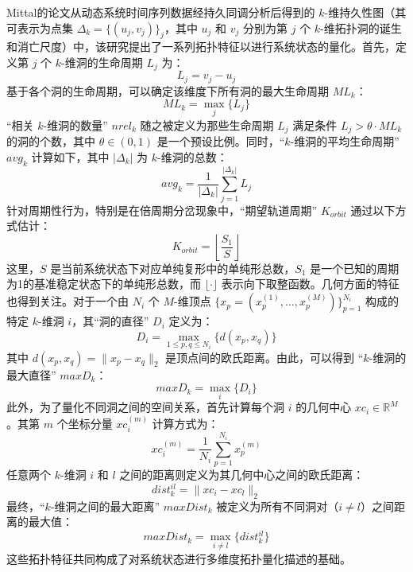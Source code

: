             Mittal的论文\cite{mittal2017topological}从动态系统时间序列数据经持久同调分析后得到的 $k$-维持久性图（其可表示为点集 $\Delta_k = \{(u_j, v_j)\}_j$，其中 $u_j$ 和 $v_j$ 分别为第 $j$ 个 $k$-维拓扑洞的诞生和消亡尺度）中，该研究提出了一系列拓扑特征以进行系统状态的量化。首先，定义第 $j$ 个 $k$-维洞的生命周期 $L_j$ 为：
            \begin{equation}
            L_j = v_j - u_j
            \end{equation}
            基于各个洞的生命周期，可以确定该维度下所有洞的最大生命周期 $ML_k$：
            \begin{equation}
            ML_k = \max_{j} \{L_j\}
            \end{equation}
            “相关 $k$-维洞的数量” $nrel_k$ 随之被定义为那些生命周期 $L_j$ 满足条件 $L_j > \theta \cdot ML_k$ 的洞的个数，其中 $\theta \in (0,1)$ 是一个预设比例。同时，“$k$-维洞的平均生命周期” $avg_k$ 计算如下，其中 $|\Delta_k|$ 为 $k$-维洞的总数：
            \begin{equation}
            avg_k = \frac{1}{|\Delta_k|} \sum_{j=1}^{|\Delta_k|} L_j
            \end{equation}
            针对周期性行为，特别是在倍周期分岔现象中，“期望轨道周期” $K_{orbit}$ 通过以下方式估计：
            \begin{equation}
            K_{orbit} = \left\lfloor \frac{S_1}{S} \right\rfloor
            \end{equation}
            这里，$S$ 是当前系统状态下对应单纯复形中的单纯形总数，$S_1$ 是一个已知的周期为1的基准稳定状态下的单纯形总数，而 $\lfloor \cdot \rfloor$ 表示向下取整函数。几何方面的特征也得到关注。对于一个由 $N_i$ 个 $M$-维顶点 $\{x_p = (x_p^{(1)}, \ldots, x_p^{(M)})\}_{p=1}^{N_i}$ 构成的特定 $k$-维洞 $i$，其“洞的直径” $D_i$ 定义为：
            \begin{equation}
            D_i = \max_{1 \le p, q \le N_i} \{ d(x_p, x_q) \}
            \end{equation}
            其中 $d(x_p, x_q) = \|x_p - x_q\|_2$ 是顶点间的欧氏距离。由此，可以得到 “$k$-维洞的最大直径” $maxD_k$：
            \begin{equation}
            maxD_k = \max_{i} \{D_i\}
            \end{equation}
            此外，为了量化不同洞之间的空间关系，首先计算每个洞 $i$ 的几何中心 $xc_i \in \mathbb{R}^M$。其第 $m$ 个坐标分量 $xc_i^{(m)}$ 计算方式为：
            \begin{equation}
            xc_i^{(m)} = \frac{1}{N_i} \sum_{p=1}^{N_i} x_p^{(m)}
            \end{equation}
            任意两个 $k$-维洞 $i$ 和 $l$ 之间的距离则定义为其几何中心之间的欧氏距离：
            \begin{equation}
            dist_k^{il} = \|xc_i - xc_l\|_2
            \end{equation}
            最终，“$k$-维洞之间的最大距离” $maxDist_k$ 被定义为所有不同洞对（$i \neq l$）之间距离的最大值：
            \begin{equation}
            maxDist_k = \max_{i \neq l} \{dist_k^{il}\}
            \end{equation}
            这些拓扑特征共同构成了对系统状态进行多维度拓扑量化描述的基础。
            
